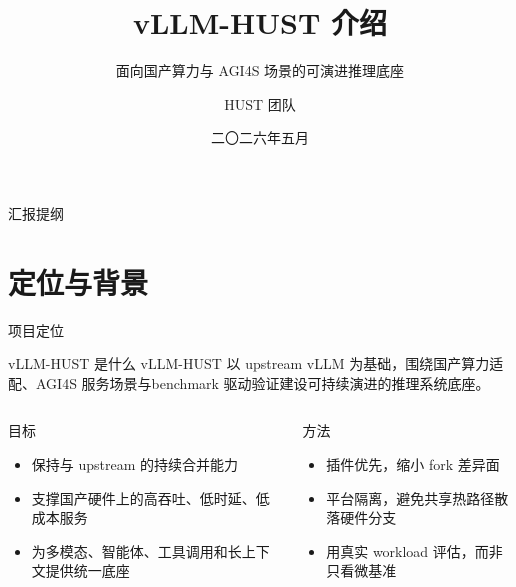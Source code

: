 \documentclass[aspectratio=169,11pt,fontset=none]{ctexbeamer}
\title{vLLM-HUST 介绍}
\subtitle{面向国产算力与 AGI4S 场景的可演进推理底座}
\author{HUST 团队}
\date{二〇二六年五月}
\begin{document}
\begin{frame}[plain]
  \titlepage
\end{frame}

\begin{frame}{汇报提纲}
  \tableofcontents
\end{frame}

\section{定位与背景}

\begin{frame}{项目定位}
  \begin{block}{vLLM-HUST 是什么}
    vLLM-HUST 以 upstream vLLM 为基础，围绕\alert{国产算力适配}、\alert{AGI4S 服务场景}与\alert{benchmark 驱动验证}建设可持续演进的推理系统底座。
  \end{block}

  \vspace{0.6em}
  \begin{columns}[T]
    \begin{block}{目标}
      \begin{itemize}
        \item 保持与 upstream 的持续合并能力
        \item 支撑国产硬件上的高吞吐、低时延、低成本服务
        \item 为多模态、智能体、工具调用和长上下文提供统一底座
      \end{itemize}
    \end{block}

    \begin{block}{方法}
      \begin{itemize}
        \item 插件优先，缩小 fork 差异面
        \item 平台隔离，避免共享热路径散落硬件分支
        \item 用真实 workload 评估，而非只看微基准
      \end{itemize}
    \end{block}
  \end{columns}
\end{frame}
\end{document}
